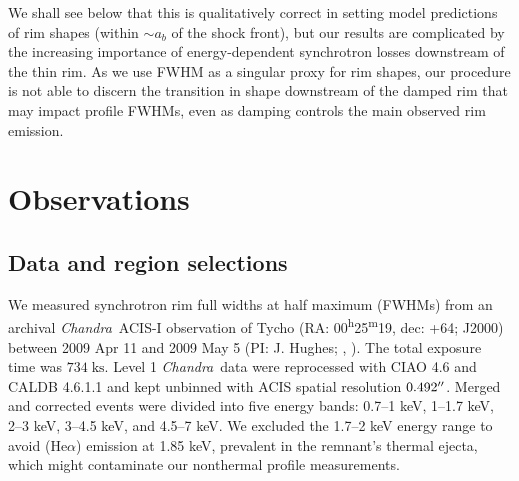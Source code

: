 \documentclass[iop, apj, numberedappendix]{emulateapj}
\newcommand*{\mt}{\mathrm}
\newcommand*{\unit}[1]{\;\mt{#1}}  %
\newcommand*{\abt}{\mathord{\sim}} %
\newcommand*{\tsup}{\textsuperscript}
\newcommand*{\Chandra}{\textit{Chandra}\ }
\begin{document}
We shall see below that this is qualitatively correct in setting model
predictions of rim shapes (within $\abt a_b$ of the shock front), but our
results are complicated by the increasing importance of energy-dependent
synchrotron losses downstream of the thin rim.  As we use FWHM as a singular
proxy for rim shapes, our procedure is not able to discern the transition in
shape downstream of the damped rim that may impact profile FWHMs, even as
damping controls the main observed rim emission.


\section{Observations}
\label{sec:observations}

\subsection{Data and region selections}
\label{sec:regions}

We measured synchrotron rim full widths at half maximum (FWHMs) from an
archival \Chandra ACIS-I observation of Tycho
(RA: 00\tsup{h}25\tsup{m}19, dec: +64; J2000)
between 2009 Apr 11 and 2009 May 5 (PI: J. Hughes;
,
).
The total exposure time was $734 \unit{ks}$.
Level 1 \Chandra data were reprocessed with CIAO 4.6 and CALDB 4.6.1.1 and kept
unbinned with ACIS spatial resolution $0.492\mbox{$^{\prime\prime}$}$.
Merged and corrected events were divided into five energy bands:
0.7--1 keV, 1--1.7 keV, 2--3 keV, 3--4.5 keV, and 4.5--7 keV.
We excluded the 1.7--2 keV energy range to avoid  (He$\alpha$)
emission at 1.85 keV, prevalent in the remnant's thermal ejecta, which
might contaminate our nonthermal profile measurements.
\end{document}
